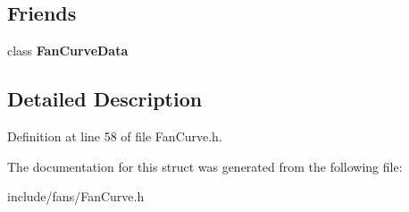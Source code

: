 \subsection*{Friends}
\begin{DoxyCompactItemize}
\item 
\mbox{\label{struct_fan_curve_data_1_1_base_operating_point_a84779ae1f4b93a96435593980fe1445b}} 
class {\bfseries Fan\+Curve\+Data}
\end{DoxyCompactItemize}


\subsection{Detailed Description}


Definition at line 58 of file Fan\+Curve.\+h.



The documentation for this struct was generated from the following file\+:\begin{DoxyCompactItemize}
\item 
include/fans/Fan\+Curve.\+h\end{DoxyCompactItemize}
